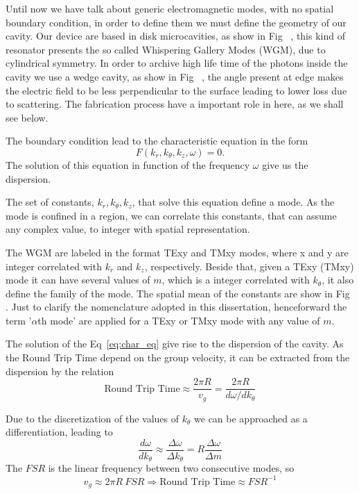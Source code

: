 Until now we have talk about generic electromagnetic modes, with no spatial boundary condition, in order to define them we must define the geometry of our cavity. Our device are based in disk microcavities, as show in Fig~%
, this kind of resonator presents the so called Whispering Gallery Modes (WGM), due to cylindrical symmetry. In order to archive high life time of the photons inside the cavity we use a wedge cavity, as show in Fig~%
, the angle present at edge makes the electric field to be less perpendicular to the surface leading to lower loss due to scattering. The fabrication process have a important role in here, as we shall see below. 

The boundary condition lead to the characteristic equation in the form 
\begin{equation}
    F(k_r,k_\theta,k_z,\omega) = 0.
    \label{eq:char_eq}
\end{equation}
The solution of this equation in function of the frequency $\omega$ give us the dispersion. 

The set of constants, $k_r,k_\theta,k_z$, that solve this equation define a mode. As the mode is confined in a region, we can correlate this constants, that can assume any complex value, to integer with spatial representation.

The WGM are labeled in the format TExy and TMxy modes, where x and y are integer correlated with $k_r$ and $k_z$, respectively. Beside that, given a TExy (TMxy) mode it can have several values of $m$, which is a integer correlated with $k_\theta$, it also define the family of the mode. The spatial mean of the constants are show in Fig~%
. Just to clarify the nomenclature adopted in this dissertation, henceforward the term '$\alpha$th mode' are applied for a TExy or TMxy mode with any value of $m$. 

The solution of the Eq~\ref{eq:char_eq} give rise to the dispersion of the cavity. As the Round Trip Time depend on the group velocity, it can be extracted from the dispersion by the relation
\begin{equation}
    \text{Round Trip Time} \approx \frac{2\pi R}{v_g} = \frac{2\pi R}{d\omega/dk_\theta} 
\end{equation}

Due to the discretization of the values of $k_\theta$ we can be approached as a differentiation, leading to
\begin{equation}
    \frac{d\omega}{dk_\theta} \approx \frac{\Delta \omega}{\Delta k_\theta} = R\frac{\Delta \omega}{\Delta m}
\end{equation}
The $FSR$ is the linear frequency between two consecutive modes, so
\begin{equation}
    v_g \approx 2\pi R~FSR \Rightarrow \text{Round Trip Time} \approx FSR^{-1} 
\end{equation}

